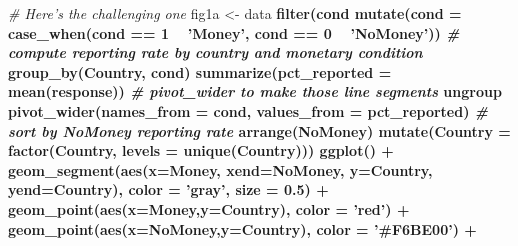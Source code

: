 \documentclass[12pt,halfline,a4paper,]{ouparticle}
\newenvironment{Shaded}{\begin{snugshade}}{\end{snugshade}}
\newcommand{\CommentTok}[1]{\textcolor[rgb]{0.56,0.35,0.01}{\textit{#1}}}
\newcommand{\DataTypeTok}[1]{\textcolor[rgb]{0.13,0.29,0.53}{#1}}
\newcommand{\DecValTok}[1]{\textcolor[rgb]{0.00,0.00,0.81}{#1}}
\newcommand{\FloatTok}[1]{\textcolor[rgb]{0.00,0.00,0.81}{#1}}
\newcommand{\KeywordTok}[1]{\textcolor[rgb]{0.13,0.29,0.53}{\textbf{#1}}}
\newcommand{\NormalTok}[1]{#1}
\newcommand{\OperatorTok}[1]{\textcolor[rgb]{0.81,0.36,0.00}{\textbf{#1}}}
\newcommand{\StringTok}[1]{\textcolor[rgb]{0.31,0.60,0.02}{#1}}
\begin{document}
\begin{Shaded}
\begin{Highlighting}[]
\CommentTok{# Here's the challenging one}
\NormalTok{fig1a <-}\StringTok{ }\NormalTok{data }\OperatorTok{%
\StringTok{  }\KeywordTok{filter}\NormalTok{(cond }\OperatorTok{%
\StringTok{  }\KeywordTok{mutate}\NormalTok{(}\DataTypeTok{cond =} \KeywordTok{case_when}\NormalTok{(cond }\OperatorTok{==}\StringTok{ }\DecValTok{1} \OperatorTok{~}\StringTok{ 'Money'}\NormalTok{, }
\NormalTok{                          cond }\OperatorTok{==}\StringTok{ }\DecValTok{0} \OperatorTok{~}\StringTok{ 'NoMoney'}\NormalTok{)) }\OperatorTok{%
\StringTok{  }\CommentTok{# compute reporting rate by country and monetary condition}
\StringTok{  }\KeywordTok{group_by}\NormalTok{(Country,}
\NormalTok{           cond) }\OperatorTok{%
\StringTok{  }\KeywordTok{summarize}\NormalTok{(}\DataTypeTok{pct_reported =} \KeywordTok{mean}\NormalTok{(response)) }\OperatorTok{%
\StringTok{  }\CommentTok{# pivot_wider to make those line segments}
\StringTok{  }\NormalTok{ungroup }\OperatorTok{%
\StringTok{  }\KeywordTok{pivot_wider}\NormalTok{(}\DataTypeTok{names_from =}\NormalTok{ cond, }\DataTypeTok{values_from =}\NormalTok{ pct_reported) }\OperatorTok{%
\StringTok{  }\CommentTok{# sort by NoMoney reporting rate}
\StringTok{  }\KeywordTok{arrange}\NormalTok{(NoMoney) }\OperatorTok{%
\StringTok{  }\KeywordTok{mutate}\NormalTok{(}\DataTypeTok{Country =} \KeywordTok{factor}\NormalTok{(Country, }\DataTypeTok{levels =} \KeywordTok{unique}\NormalTok{(Country))) }\OperatorTok{%
\StringTok{  }\KeywordTok{ggplot}\NormalTok{() }\OperatorTok{+}
\StringTok{  }\KeywordTok{geom_segment}\NormalTok{(}\KeywordTok{aes}\NormalTok{(}\DataTypeTok{x=}\NormalTok{Money, }\DataTypeTok{xend=}\NormalTok{NoMoney, }\DataTypeTok{y=}\NormalTok{Country, }\DataTypeTok{yend=}\NormalTok{Country),}
               \DataTypeTok{color =} \StringTok{'gray'}\NormalTok{, }\DataTypeTok{size =} \FloatTok{0.5}\NormalTok{) }\OperatorTok{+}\StringTok{ }
\StringTok{  }\KeywordTok{geom_point}\NormalTok{(}\KeywordTok{aes}\NormalTok{(}\DataTypeTok{x=}\NormalTok{Money,}\DataTypeTok{y=}\NormalTok{Country), }\DataTypeTok{color =} \StringTok{'red'}\NormalTok{) }\OperatorTok{+}
\StringTok{  }\KeywordTok{geom_point}\NormalTok{(}\KeywordTok{aes}\NormalTok{(}\DataTypeTok{x=}\NormalTok{NoMoney,}\DataTypeTok{y=}\NormalTok{Country), }\DataTypeTok{color =} \StringTok{'#F6BE00'}\NormalTok{) }\OperatorTok{+}
}}}}}}}}}
\end{Highlighting}
\end{Shaded}
\end{document}
